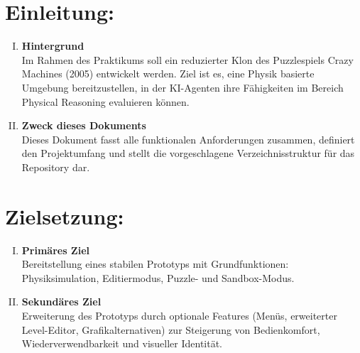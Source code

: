 \documentclass[]{exercise}
\begin{document}
    \section{Einleitung:}
        \begin{enumerate}[I.]
            \item \textbf{Hintergrund}\\
                Im Rahmen des Praktikums soll ein reduzierter Klon des Puzzlespiels Crazy Machines (2005) entwickelt werden. Ziel ist es, eine Physik basierte Umgebung bereitzustellen, in der KI-Agenten ihre Fähigkeiten im Bereich Physical Reasoning evaluieren können.
            \item \textbf{Zweck dieses Dokuments}\\
                 Dieses Dokument fasst alle funktionalen Anforderungen zusammen, definiert den Projektumfang und stellt die vorgeschlagene Verzeichnisstruktur für das Repository dar.
        \end{enumerate}

    \section{Zielsetzung:}
        \begin{enumerate}[I.]
            \item \textbf{Primäres Ziel}\\
                Bereitstellung eines stabilen Prototyps mit Grundfunktionen: Physiksimulation, Editiermodus, Puzzle- und Sandbox-Modus.
            \item \textbf{Sekundäres Ziel}\\
                Erweiterung des Prototyps durch optionale Features (Menüs, erweiterter Level-Editor, Grafikalternativen) zur Steigerung von Bedienkomfort, Wiederverwendbarkeit und visueller Identität.
        \end{enumerate}

\end{document}
